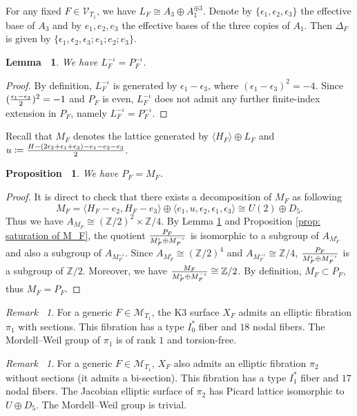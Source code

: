 \documentclass[12pt,reqno,a4paper]{amsart}
\newtheorem{lem}[thm]{Lemma~}
\newtheorem{prop}[thm]{Proposition~}
\theoremstyle{remark}
\newtheorem{rmk}[thm]{Remark~}
\theoremstyle{definition}
\begin{document}
For any fixed $F\in\mathcal{V}_{T_1}$, we have $L_F\cong A_3\oplus A_1^{\oplus 3}$.
Denote by $\{\epsilon_1,\epsilon_2,\epsilon_3\}$ the effective base of $A_3$ and by $e_1,e_2,e_3$ the effective bases of the three copies of $A_1$.
Then $\Delta_F$ is given by $\{ \epsilon_1,\epsilon_2,\epsilon_3;e_1;e_2;e_3 \}$.
\begin{lem}
\label{lem: 1 A_3 + 3 A_1: L_F^-iota = P_F^-iota}
    We have $L_F^{-\iota} = P_F^{-\iota}$.
\end{lem}
\begin{proof}
    By definition, $L_F^{-\iota}$ is generated by $\epsilon_1-\epsilon_3$, where $(\epsilon_1-\epsilon_3)^2=-4$.
    Since $({\epsilon_1-\epsilon_3\over2})^2=-1$ and $P_F$ is even, $L_F^{-\iota}$ does not admit any further finite-index extension in $P_F$, namely $L_F^{-\iota} = P_F^{-\iota}$.
\end{proof}
Recall that $M_F$ denotes the lattice generated by $\langle H_F\rangle\oplus L_F$ and $u\coloneqq{H-(2\epsilon_2+\epsilon_1+\epsilon_3)-e_1-e_2-e_3\over2}$.
\begin{prop}
\label{prop: 1 A_3 + 3 A_1: P=M}
    We have $P_F=M_F$. 
\end{prop}
\begin{proof} 
        It is direct to check that there exists a decomposition of $M_F$ as following
    \begin{equation*}
        M_F = \langle H_F-e_2,H_F-e_3 \rangle \oplus \langle e_1,u,\epsilon_2,\epsilon_1,\epsilon_3 \rangle \cong U(2)\oplus D_5.
    \end{equation*}
        Thus we have $A_{M_F}\cong (\mathbb{Z}/2)^2\times\mathbb{Z}/4$.
    By Lemma \ref{lem: 1 A_3 + 3 A_1: L_F^-iota = P_F^-iota} and Proposition \ref{prop: saturation of M_F}, the quotient $P_F\over{M_F^\iota\oplus M_F^{-\iota}}$ is isomorphic to a subgroup of $A_{M_F^\iota}$ and also a subgroup of $A_{M_F^{-\iota}}$.
    Since $A_{M_F^\iota}\cong(\mathbb{Z}/2)^4$ and $A_{M_F^{-\iota}}\cong\mathbb{Z}/4$, $P_F\over{M_F^\iota\oplus M_F^{-\iota}}$ is a subgroup of $\mathbb{Z}/2$.
    Moreover, we have ${M_F\over{M_F^\iota\oplus M_F^{-\iota}}}\cong\mathbb{Z}/2$.
    By definition, $M_F\subset P_F$, thus $M_F=P_F$.
\end{proof}




\begin{rmk}
    For a generic $F\in\mathcal{M}_{T_1}$, the K3 surface $X_F$ admits an elliptic fibration $\pi_1$ with sections. This fibration has a type $I_0^*$ fiber and $18$ nodal fibers.
    The Mordell--Weil group of $\pi_1$ is of rank $1$ and torsion-free.
\end{rmk}
\begin{rmk}
    For a generic $F\in\mathcal{M}_{T_1}$, $X_F$ also admits an elliptic fibration $\pi_2$ without sections (it admits a bi-section). This fibration has a type $I_1^*$ fiber and $17$ nodal fibers.
        The Jacobian elliptic surface of $\pi_2$ has Picard lattice isomorphic to $U\oplus D_5$. The Mordell--Weil group is trivial.
\end{rmk}
\end{document}
